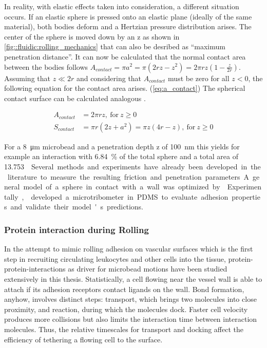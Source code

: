In reality, with elastic effects taken into consideration, a different situation occurs. If an elastic sphere is pressed onto an elastic plane (ideally of the same material), both bodies deform and a Hertzian pressure distribution arises. The center of the sphere is moved down by an \gls{z} as shown in \cref{fig::fluidic:rolling_mechanics} that can also be desribed as ``maximum penetration distance''. It can now be calculated that the normal contact area between the bodies follows $A_{contact} = \pi a^{2}=\pi\left(2 r z-z^{2}\right)=2 \pi r z\left(1-\frac{z}{2 r}\right)$. Assuming that $z \ll 2r$ and considering that $A_{contact}$ must be zero for all $z < 0$, the following equation for the contact area arises. (\cref{eq:a_contact}) The spherical contact surface can be calculated analogous .\cite{lit:fluid:rolling:contact_ground_plane}

\begin{align}
	A_{contact} &= 2\pi r z \mathrm{, \ for \ } z \geq 0 \label{eq:a_contact}\\
	S_{contact} &= \pi r (2z + a^2) = \pi z (4r - z)  \mathrm{, \ for \ } z \geq 0 \label{eq:s_contact}
\end{align}

For a \SI{8}{\micro\meter} microbead and a penetration depth \gls{z} of \SI{100}{\nano\meter} this yields for example an interaction with \SI{6.84}{\percent} of the total sphere and a total area of \SI{13.753}{\micro\meter\square}. Several methods and experiments have already been developed in the literature to measure the resulting friction and penetration parameters. A general model of a sphere in contact with a wall was optimized by \citet{lit:fluid:sphere_planeWall}. Experimentally, \citet{lit:fluid:rolling:contact} developed a microtribometer in PDMS to evaluate adhesion properties and validate their model's predictions.

\subsubsection{Protein interaction during Rolling}
In the attempt to mimic rolling adhesion on vascular surfaces which is the first step in recruiting circulating leukocytes and other cells into the tissue, protein-protein-interactions as driver for microbead motions have been studied extensively in this thesis. Statistically, a cell flowing near the vessel wall is able to attach if its adhesion receptors contact ligands on the wall. Bond formation, anyhow, involves distinct steps: transport, which brings two molecules into close proximity, and reaction, during which the molecules dock. Faster cell velocity produces more collisions but also limits the interaction time between interaction molecules. Thus, the relative timescales for transport and docking affect the efficiency of tethering a flowing cell to the surface.\cite{lit:bio:CellAdhesion}


